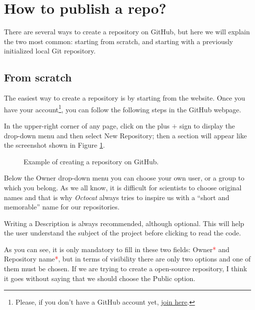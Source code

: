 \section{How to publish a repo?}

There are several ways to create a repository on \textsf{GitHub}, but here we will explain the two most common: starting from scratch, and starting with a previously initialized local Git repository.

\subsection{From scratch}

The easiest way to create a repository is by starting from the website. Once you have your account\footnote{Please, if you don't have a \textsf{GitHub} account yet, \href{https://github.com/join}{join here}.}, you can follow the following steps in the \textsf{GitHub} webpage.

In the upper-right corner of any page, click on the plus $+$ sign to display the drop-down menu and then select \textsf{New Repository}; then a section will appear like the screenshot shown in Figure \ref{fig:Repo}.

\begin{figure} %
    \centering
    \caption{Example of creating a repository on \textsf{GitHub}.}
    \label{fig:Repo}
\end{figure}

Below the \textsf{Owner} drop-down menu you can choose your own user, or a group to which you belong. As we all know, it is difficult for scientists to choose original names and that is why \textit{Octocat} always tries to inspire us with a ``short and memorable'' name for our repositories.

Writing a \textsf{Description} is always recommended, although optional. This will help the user understand the subject of the project before clicking to read the code.

As you can see, it is only mandatory to fill in these two fields: \textsf{Owner}\textcolor{red}{*} and \textsf{Repository name}\textcolor{red}{*}, but in terms of visibility there are only two options and one of them must be chosen. If we are trying to create a open-source repository, I think it goes without saying that we should choose the \textsf{Public} option.

